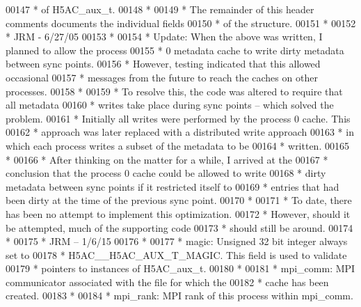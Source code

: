 \begin{DoxyCode}
00147 \textcolor{comment}{ * of H5AC\_aux\_t.}
00148 \textcolor{comment}{ *}
00149 \textcolor{comment}{ * The remainder of this header comments documents the individual fields}
00150 \textcolor{comment}{ * of the structure.}
00151 \textcolor{comment}{ *}
00152 \textcolor{comment}{ *                                              JRM - 6/27/05}
00153 \textcolor{comment}{ *}
00154 \textcolor{comment}{ * Update: When the above was written, I planned to allow the process}
00155 \textcolor{comment}{ *  0 metadata cache to write dirty metadata between sync points.}
00156 \textcolor{comment}{ *  However, testing indicated that this allowed occasional }
00157 \textcolor{comment}{ *  messages from the future to reach the caches on other processes.}
00158 \textcolor{comment}{ *}
00159 \textcolor{comment}{ *  To resolve this, the code was altered to require that all metadata}
00160 \textcolor{comment}{ *  writes take place during sync points -- which solved the problem.}
00161 \textcolor{comment}{ *  Initially all writes were performed by the process 0 cache.  This }
00162 \textcolor{comment}{ *  approach was later replaced with a distributed write approach}
00163 \textcolor{comment}{ *  in which each process writes a subset of the metadata to be }
00164 \textcolor{comment}{ *  written.  }
00165 \textcolor{comment}{ *}
00166 \textcolor{comment}{ *  After thinking on the matter for a while, I arrived at the }
00167 \textcolor{comment}{ *  conclusion that the process 0 cache could be allowed to write }
00168 \textcolor{comment}{ *  dirty metadata between sync points if it restricted itself to }
00169 \textcolor{comment}{ *  entries that had been dirty at the time of the previous sync point.  }
00170 \textcolor{comment}{ *  }
00171 \textcolor{comment}{ *  To date, there has been no attempt to implement this optimization.}
00172 \textcolor{comment}{ *  However, should it be attempted, much of the supporting code }
00173 \textcolor{comment}{ *  should still be around.}
00174 \textcolor{comment}{ *}
00175 \textcolor{comment}{ *                      JRM -- 1/6/15}
00176 \textcolor{comment}{ *}
00177 \textcolor{comment}{ * magic:       Unsigned 32 bit integer always set to}
00178 \textcolor{comment}{ *      H5AC\_\_H5AC\_AUX\_T\_MAGIC.  This field is used to validate}
00179 \textcolor{comment}{ *      pointers to instances of H5AC\_aux\_t.}
00180 \textcolor{comment}{ *}
00181 \textcolor{comment}{ * mpi\_comm:    MPI communicator associated with the file for which the}
00182 \textcolor{comment}{ *      cache has been created.}
00183 \textcolor{comment}{ *}
00184 \textcolor{comment}{ * mpi\_rank:    MPI rank of this process within mpi\_comm.}

\end{DoxyCode}
